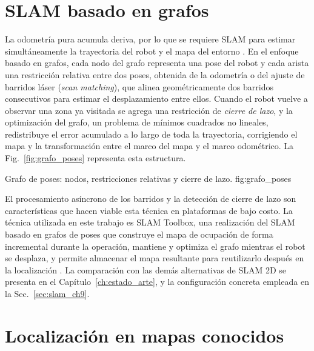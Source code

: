 \section{SLAM basado en grafos}
\label{sec:slam}

La odometría pura acumula deriva, por lo que se requiere SLAM para estimar
simultáneamente la trayectoria del robot y el mapa del entorno
\citep{thrun2005probabilistic,ngoc2023efficient}. En el enfoque basado en
grafos, cada nodo del grafo representa una pose del robot y cada arista una
restricción relativa entre dos poses, obtenida de la odometría o del ajuste
de barridos láser (\textit{scan matching}), que alinea geométricamente dos
barridos consecutivos para estimar el desplazamiento entre ellos. Cuando el
robot vuelve a observar una zona ya visitada se agrega una restricción de
\emph{cierre de lazo}, y la optimización del grafo, un problema de mínimos
cuadrados no lineales, redistribuye el error acumulado a lo largo de toda
la trayectoria, corrigiendo el mapa y la transformación entre el marco del
mapa y el marco odométrico. La Fig.~\ref{fig:grafo_poses} representa esta
estructura.

{Grafo de poses: nodos, restricciones relativas y cierre de lazo.}
{fig:grafo_poses}

El procesamiento asíncrono de los barridos y la detección de cierre de lazo
son características que hacen viable esta técnica en plataformas de bajo
costo. La técnica utilizada en este trabajo es SLAM Toolbox, una realización del SLAM basado en grafos de
poses que construye el mapa de ocupación de forma incremental durante la
operación, mantiene y optimiza el grafo mientras el robot se desplaza, y
permite almacenar el mapa resultante para reutilizarlo después en la
localización \citep{macenski2021slamtoolbox}. La comparación con las demás
alternativas de SLAM 2D se presenta en el Capítulo~\ref{ch:estado_arte}, y la
configuración concreta empleada en la Sec.~\ref{sec:slam_ch9}.

\section{Localización en mapas conocidos}
\label{sec:localizacion_marco}

